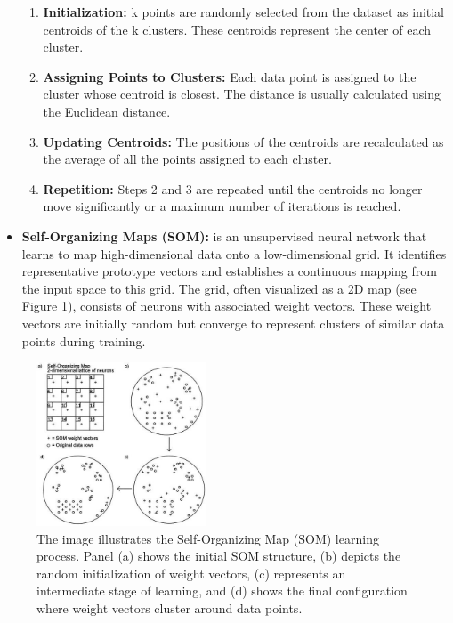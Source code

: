 \documentclass{llncs}
\begin{document}
\begin{itemize}
		\begin{enumerate}
			\item \textbf{Initialization:} k points are randomly selected from the dataset as initial centroids of the k clusters. These centroids represent the center of each cluster.
			\item \textbf{Assigning Points to Clusters:} Each data point is assigned to the cluster whose centroid is closest. The distance is usually calculated using the Euclidean distance.
			\item \textbf{Updating Centroids:} The positions of the centroids are recalculated as the average of all the points assigned to each cluster.
			\item \textbf{Repetition:} Steps 2 and 3 are repeated until the centroids no longer move significantly or a maximum number of iterations is reached.\cite{steinley2006}
		\end{enumerate}
		
		\item \textbf{Self-Organizing Maps (SOM):} is an unsupervised neural network that learns to map high-dimensional data onto a low-dimensional grid. It identifies representative prototype vectors and establishes a continuous mapping from the input space to this grid. The grid, often visualized as a 2D map (see Figure \ref{fig:som}), consists of neurons with associated weight vectors. These weight vectors are initially random but converge to represent clusters of similar data points during training.
		
	
\end{itemize}

\begin{figure}[h!]
	\begin{center}  %
		\includegraphics[width=0.45\textwidth]{images/som.jpg}
		\caption{The image illustrates the Self-Organizing Map (SOM) learning process. Panel (a) shows the initial SOM structure, (b) depicts the random initialization of weight vectors, (c) represents an intermediate stage of learning, and (d) shows the final configuration where weight vectors cluster around data points.}
		\label{fig:som}
	\end{center}
\end{figure}
\end{document}
